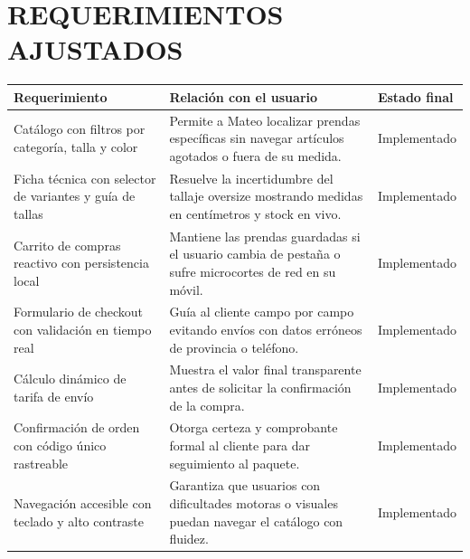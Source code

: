 \documentclass[12pt]{article}
\begin{document}
\section*{REQUERIMIENTOS AJUSTADOS}

\begin{table}[H]
\centering
\small
\renewcommand{\arraystretch}{1.3}
\begin{tabularx}{\textwidth}{|>{\raggedright\arraybackslash}p{}|X|>{\centering\arraybackslash}p{}|}
\hline
\textbf{Requerimiento} & \textbf{Relación con el usuario} & \textbf{Estado final} \\ \hline
Catálogo con filtros por categoría, talla y color & Permite a Mateo localizar prendas específicas sin navegar artículos agotados o fuera de su medida. & Implementado \\ \hline
Ficha técnica con selector de variantes y guía de tallas & Resuelve la incertidumbre del tallaje oversize mostrando medidas en centímetros y stock en vivo. & Implementado \\ \hline
Carrito de compras reactivo con persistencia local & Mantiene las prendas guardadas si el usuario cambia de pestaña o sufre microcortes de red en su móvil. & Implementado \\ \hline
Formulario de checkout con validación en tiempo real & Guía al cliente campo por campo evitando envíos con datos erróneos de provincia o teléfono. & Implementado \\ \hline
Cálculo dinámico de tarifa de envío & Muestra el valor final transparente antes de solicitar la confirmación de la compra. & Implementado \\ \hline
Confirmación de orden con código único rastreable & Otorga certeza y comprobante formal al cliente para dar seguimiento al paquete. & Implementado \\ \hline
Navegación accesible con teclado y alto contraste & Garantiza que usuarios con dificultades motoras o visuales puedan navegar el catálogo con fluidez. & Implementado \\ \hline
\end{tabularx}
\end{table}
\end{document}
